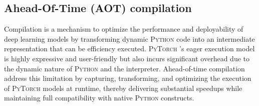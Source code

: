 \subsection{Ahead-Of-Time (AOT) compilation}

Compilation is a mechanism to optimize the performance and deployability of deep learning models by transforming dynamic \textsc{Python} code into an intermediate representation that can be efficiency executed. 
\textsc{PyTorch} \cite{pytorch}'s eager execution model is highly expressive and user-friendly but also incurs significant overhead due to the dynamic nature of \textsc{Python} and the interpreter. 
Ahead-of-time compilation address this limitation by capturing, transforming, and optimizing the execution of \textsc{PyTorch} models at runtime, thereby delivering substantial speedups while maintaining full compatibility with native \textsc{Python} constructs.

